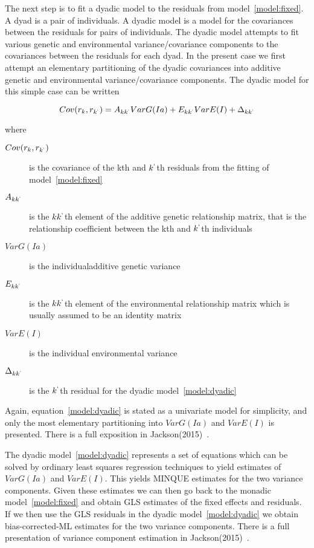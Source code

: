 \documentclass[titlepage]{article}  %
\begin{document}
The next step is to fit a dyadic model to the residuals from model~\ref{model:fixed}. A dyad is a pair of individuals. A dyadic model is a model for the covariances between the residuals for pairs of individuals. The dyadic model attempts to fit various genetic and environmental variance/covariance components to the covariances between the residuals for each dyad. In the present case we first attempt an elementary partitioning of the dyadic covariances into additive genetic and environmental variance/covariance components. The dyadic model for this simple case can be written

\begin{equation}
\label{model:dyadic}
Cov(r_{k},r_{k^{`}}) = A_{kk^{`}} VarG(Ia) + E_{kk^{`}} VarE(I) + \Delta_{kk^{`}}
\end{equation}

where
\begin{description}
\item[$Cov(r_{k},r_{k^{`}})$] is the covariance of the kth and $k^{`}$th residuals from the fitting of model~\ref{model:fixed}
\item[$A_{kk^{`}}$] is the $kk^{`}$th element of the additive genetic relationship matrix, that is the relationship coefficient between the kth and $k^{`}$th individuals
\item[$VarG(Ia)$] is the individualadditive genetic variance
\item[$E_{kk^{`}}$] is the $kk^{`}$th element of the environmental relationship matrix which is usually assumed to be an identity matrix
\item[$VarE(I)$] is the individual environmental variance
\item[$\Delta_{kk^{`}}$] is the $k^{`}$th residual for the dyadic model~\ref{model:dyadic}
\end{description}

Again, equation~\ref{model:dyadic} is stated as a univariate model for simplicity, and only the most elementary partitioning into $VarG(Ia)$ and $VarE(I)$ is presented. There is a full exposition in Jackson(2015)~\cite{jack:15b}. 

 The dyadic model~\ref{model:dyadic} represents a set of equations which can be solved by ordinary least squares regression techniques to yield estimates of $VarG(Ia)$  and $VarE(I)$. This yields MINQUE estimates for the two variance components. Given these estimates we can then go back to the monadic model~\ref{model:fixed} and obtain GLS estimates of the fixed effects and residuals. If we then use the GLS residuals in the dyadic model~\ref{model:dyadic} we obtain bias-corrected-ML estimates for the two variance components. There is a full presentation of variance component estimation in Jackson(2015)~\cite{jack:15b}.
\end{document}
